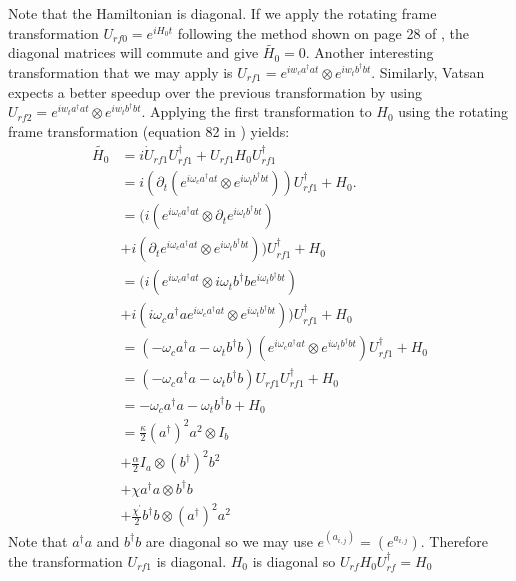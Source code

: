 \documentclass[letterpaper, 12pt]{article}
\begin{document}
Note that the Hamiltonian is diagonal. If we apply the rotating frame
transformation $U_{rf0} = e^{iH_{0}t}$ following the method shown on page 28 of \cite{krantz2019quantum}, the diagonal matrices will commute and give $\tilde{H_{0}} = 0$. Another interesting transformation that we may apply is $U_{rf1} = e^{iw_{c}a^{\dagger}at} \otimes e^{iw_{t}b^{\dagger}bt}$. Similarly, Vatsan expects a better speedup over the previous transformation by using $U_{rf2} = e^{iw_{t}a^{\dagger}at} \otimes e^{iw_{t}b^{\dagger}bt}$. Applying the first transformation to $H_{0}$ using the rotating frame transformation (equation 82 in \cite{krantz2019quantum}) yields:
\begin{align*}
  \tilde{H_{0}}
  &= i\dot{U}_{rf1}U_{rf1}^{\dagger} + U_{rf1}H_{0}U_{rf1}^{\dagger}\\
  &= i({\partial_{t}}(e^{i\omega_{c}a^{\dagger}at} \otimes e^{i\omega_{t}b^{\dagger}bt}))U_{rf1}^{\dagger} + H_{0}.\\
  &= (i(e^{i\omega_{c}a^{\dagger}at} \otimes {\partial_{t}}e^{i\omega_{t}b^{\dagger}bt})\\
  &+ i({\partial_{t}}e^{i\omega_{c}a^{\dagger}at} \otimes e^{i\omega_{t}b^{\dagger}bt}))U_{rf1}^{\dagger} + H_{0}\\
  &= (i(e^{i\omega_{c}a^{\dagger}at} \otimes i\omega_{t}b^{\dagger}be^{i\omega_{t}b^{\dagger}bt})\\
  &+ i(i\omega_{c}a^{\dagger}ae^{i\omega_{c}a^{\dagger}at} \otimes e^{i\omega_{t}b^{\dagger}bt}))U_{rf1}^{\dagger} + H_{0}\\
  &= (-\omega_{c}a^{\dagger}a - \omega_{t}b^{\dagger}b)(e^{i\omega_{c}a^{\dagger}at} \otimes e^{i\omega_{t}b^{\dagger}bt})U_{rf1}^{\dagger} + H_{0}\\
  &= (-\omega_{c}a^{\dagger}a - \omega_{t}b^{\dagger}b)U_{rf1}U_{rf1}^{\dagger} + H_{0}\\
  &= -\omega_{c}a^{\dagger}a - \omega_{t}b^{\dagger}b + H_{0}\\
  &=\frac{\kappa}{2}(a^{\dagger})^{2}a^{2} \otimes I_{b}\\
  &+ \frac{\alpha}{2} I_{a} \otimes (b^{\dagger})^{2}b^{2} \\
  &+ \chi a^{\dagger}a \otimes b^{\dagger}b\\
  &+ \frac{\chi^{'}}{2}b^{\dagger}b \otimes (a^{\dagger})^{2}a^{2}
\end{align*}
Note that $a^{\dagger}a$ and $b^{\dagger}b$ are diagonal so we may use
$e^{(a_{i,j})} = (e^{a_{i,j}})$. Therefore the transformation $U_{rf1}$ is diagonal.
$H_{0}$ is diagonal so $U_{rf}H_{0}U_{rf}^{\dagger} = H_{0}$
\end{document}
